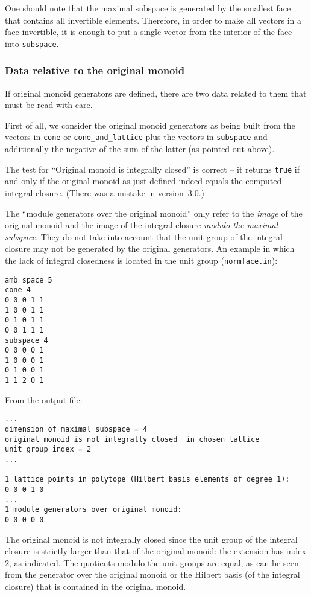 One should note that the maximal subspace is generated by the smallest face that contains all invertible elements. Therefore, in order to make all vectors in a face invertible, it is enough to put a single vector from the interior of the face into \verb|subspace|.

\subsubsection{Data relative to the original monoid}

If original monoid generators are defined, there are two data related to them that must be read with care.

First of all, we consider the original monoid generators as being built from the vectors in \verb|cone| or \verb|cone_and_lattice| plus the vectors in \verb|subspace| and additionally the negative of the sum of the latter (as pointed out above).

The test for ``Original monoid is integrally closed'' is correct -- it returns \verb|true| if and only if the original monoid as just defined indeed equals the computed integral closure. (There was a mistake in version~3.0.)

The ``module generators over the original monoid'' only refer to the \emph{image} of the original monoid and the image of the integral closure \emph{modulo the maximal subspace}. They do not take into account that the unit group of the integral closure may not be generated by the original generators. An example in which the lack of integral closedness is located in the unit group (\verb|normface.in|):

\begin{Verbatim}
amb_space 5
cone 4
0 0 0 1 1
1 0 0 1 1
0 1 0 1 1
0 0 1 1 1
subspace 4
0 0 0 0 1
1 0 0 0 1
0 1 0 0 1
1 1 2 0 1
\end{Verbatim}

From the output file:

\begin{Verbatim}
...
dimension of maximal subspace = 4
original monoid is not integrally closed  in chosen lattice
unit group index = 2
...

1 lattice points in polytope (Hilbert basis elements of degree 1):
0 0 0 1 0
...
1 module generators over original monoid:
0 0 0 0 0
\end{Verbatim}
The original monoid is not integrally closed since the unit group of the integral closure is strictly larger than that of the original monoid: the extension has index $2$, as indicated. The quotients modulo the unit groups are equal, as can be seen from the generator over the original monoid or the Hilbert basis (of the integral closure) that is contained in the original monoid.


